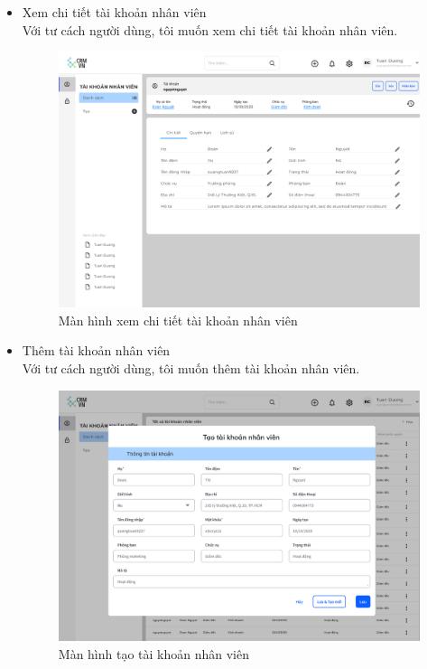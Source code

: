 \documentclass[12pt,a4paper]{article}
\begin{document}
\begin{enumerate}
\begin{itemize}
            \item Xem chi tiết tài khoản nhân viên \\
            Với tư cách người dùng, tôi muốn xem chi tiết tài khoản nhân viên.

            \begin{figure}[H]
                \centering \includegraphics[width=\textwidth]{Img/Nguyet/TKNV/chitiet.png}
                \vspace{0.5cm}
                \caption{Màn hình xem chi tiết tài khoản nhân viên}
                \label{cttknv}
            \end{figure}

            \item Thêm tài khoản nhân viên \\
            Với tư cách người dùng, tôi muốn thêm tài khoản nhân viên.

            \begin{figure}[H]
                \centering \includegraphics[width=\textwidth]{Img/Nguyet/TKNV/taotknv.png}
                \vspace{0.5cm}
                \caption{Màn hình tạo tài khoản nhân viên}
                \label{taotknv}
            \end{figure}


\end{itemize}
\end{enumerate}
\end{document}
